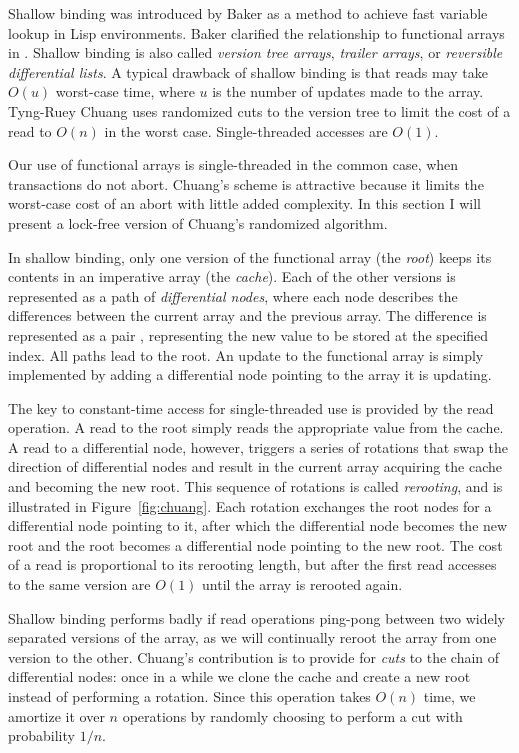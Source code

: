 Shallow binding was introduced by Baker \cite{Baker78} as a method to
achieve fast variable lookup in Lisp environments.  Baker clarified
the relationship to functional arrays in \cite{Baker91}.  Shallow
binding is also called \emph{version tree arrays}, \emph{trailer
  arrays}, or \emph{reversible differential lists}.  A typical
drawback of shallow binding is that reads may take $O(u)$ worst-case
time, where $u$ is the number of updates made to the array.  Tyng-Ruey
Chuang \cite{Chuang94} uses randomized cuts to the version tree to limit
the cost of a read to $O(n)$ in the worst case.  Single-threaded
accesses are $O(1)$.

Our use of functional arrays is single-threaded in the common case,
when transactions do not abort.  Chuang's scheme is attractive because
it limits the worst-case cost of an abort with little added
complexity.   In this section I will present a lock-free version of
Chuang's randomized algorithm.

In shallow binding, only one version of the functional array (the
\emph{root}) keeps its contents in an imperative array (the
\emph{cache}).   Each of the other versions is represented as a path
of \emph{differential nodes}, where each node describes the
differences between the current array and the previous array.  The
difference is represented as a pair ,
representing the new value to be stored at the specified index.
All paths lead to the root.  An update to the functional array is
simply implemented by adding a differential node pointing to the array it is
updating.

The key to constant-time access for single-threaded use is provided by the read
operation.  A read to the root simply reads the appropriate value from
the cache.  A read to a differential node, however, triggers a series
of rotations that swap the direction of differential nodes and result
in the current array acquiring the cache and becoming the new root.
This sequence of rotations is called \emph{rerooting}, and is
illustrated in Figure~\ref{fig:chuang}.  Each rotation
exchanges the root nodes for a differential node pointing to it, after
which the differential node becomes the new root and the root becomes
a differential node pointing to the new root. The cost of a read is
proportional to its rerooting length, but after the first read
accesses to the same version are $O(1)$ until the array is rerooted again.

Shallow binding performs badly if read operations ping-pong between two
widely separated versions of the array, as we will continually
reroot the array from one version to the other.
Chuang's contribution is to provide for \emph{cuts} to the chain of
differential nodes: once in a while we clone the cache and create a
new root instead of performing a rotation.  Since this operation takes
$O(n)$ time, we amortize it over $n$ operations by randomly
choosing to perform a cut with probability $1/n$.

